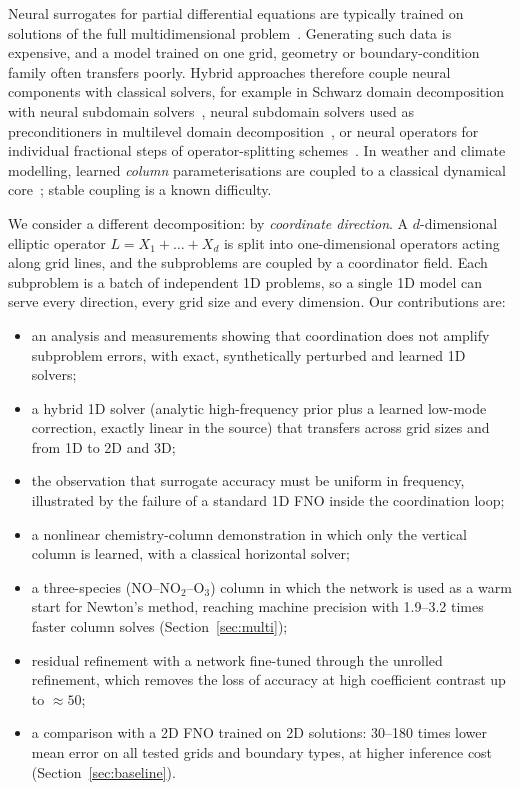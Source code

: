 \documentclass[11pt]{article}
\begin{document}
Neural surrogates for partial differential equations are typically trained on solutions of
the full multidimensional problem~\cite{li2021fno}. Generating such data is expensive, and a
model trained on one grid, geometry or boundary-condition family often transfers poorly.
Hybrid approaches therefore couple neural components with classical solvers, for example in
Schwarz domain decomposition with neural subdomain solvers~\cite{lddm2025,femdeeponet2025},
neural subdomain solvers used as preconditioners in multilevel domain decomposition~\cite{fan2025neuralprecond}, or neural operators for individual
fractional steps of operator-splitting schemes~\cite{nos2026,dosnet2022}. In weather and
climate modelling, learned \emph{column} parameterisations are coupled to a classical
dynamical core~\cite{neuralgcm2024,climsim2023}; stable coupling is a known difficulty.

We consider a different decomposition: by \emph{coordinate direction}. A $d$-dimensional
elliptic operator $L = X_1 + \dots + X_d$ is split into one-dimensional operators acting along
grid lines, and the subproblems are coupled by a coordinator field. Each subproblem is a batch
of independent 1D problems, so a single 1D model can serve every direction, every grid size
and every dimension. Our contributions are:
\begin{itemize}
  \item an analysis and measurements showing that coordination does not amplify subproblem
        errors, with exact, synthetically perturbed and learned 1D solvers;
  \item a hybrid 1D solver (analytic high-frequency prior plus a learned low-mode correction,
        exactly linear in the source) that transfers across grid sizes and from 1D to 2D and 3D;
  \item the observation that surrogate accuracy must be uniform in frequency, illustrated by
        the failure of a standard 1D FNO inside the coordination loop;
  \item a nonlinear chemistry-column demonstration in which only the vertical column is
        learned, with a classical horizontal solver;
  \item a three-species (NO--NO$_2$--O$_3$) column in which the network is used as a warm start for
        Newton's method, reaching machine precision with 1.9--3.2 times faster column solves
        (Section~\ref{sec:multi});
  \item residual refinement with a network fine-tuned through the unrolled refinement, which removes the
        loss of accuracy at high coefficient contrast up to $\approx50$;
  \item a comparison with a 2D FNO trained on 2D solutions: 30--180 times lower mean error on all tested grids
        and boundary types, at higher inference cost (Section~\ref{sec:baseline}).
\end{itemize}
\end{document}
